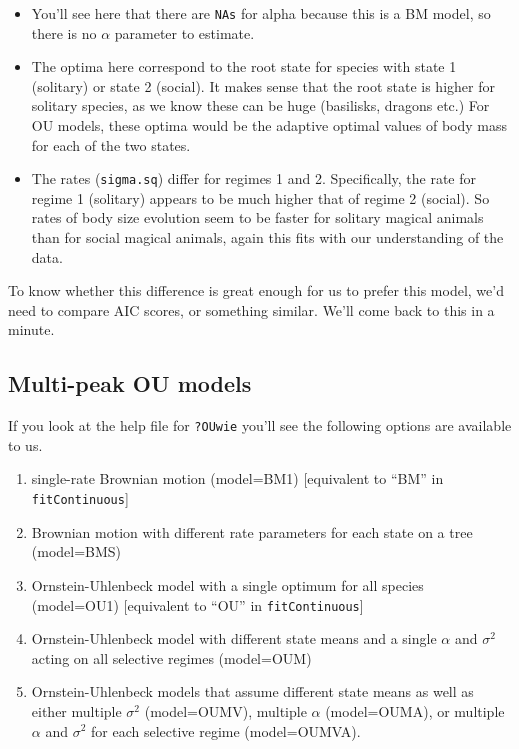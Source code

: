 \documentclass[]{book}
\providecommand{\tightlist}{%
  \setlength{\itemsep}{0pt}\setlength{\parskip}{0pt}}
\begin{document}
\begin{itemize}
\tightlist
\item
  You'll see here that there are \texttt{NAs} for alpha because this is
  a BM model, so there is no \(\alpha\) parameter to estimate.
\item
  The optima here correspond to the root state for species with state 1
  (solitary) or state 2 (social). It makes sense that the root state is
  higher for solitary species, as we know these can be huge (basilisks,
  dragons etc.) For OU models, these optima would be the adaptive
  optimal values of body mass for each of the two states.
\item
  The rates (\texttt{sigma.sq}) differ for regimes 1 and 2.
  Specifically, the rate for regime 1 (solitary) appears to be much
  higher that of regime 2 (social). So rates of body size evolution seem
  to be faster for solitary magical animals than for social magical
  animals, again this fits with our understanding of the data.
\end{itemize}

To know whether this difference is great enough for us to prefer this
model, we'd need to compare AIC scores, or something similar. We'll come
back to this in a minute.

\subsection{Multi-peak OU models}\label{multi-peak-ou-models}

If you look at the help file for \texttt{?OUwie} you'll see the
following options are available to us.

\begin{enumerate}
\def\labelenumi{\arabic{enumi}.}
\tightlist
\item
  single-rate Brownian motion (model=BM1) {[}equivalent to ``BM'' in
  \texttt{fitContinuous}{]}
\item
  Brownian motion with different rate parameters for each state on a
  tree (model=BMS)
\item
  Ornstein-Uhlenbeck model with a single optimum for all species
  (model=OU1) {[}equivalent to ``OU'' in \texttt{fitContinuous}{]}
\item
  Ornstein-Uhlenbeck model with different state means and a single
  \(\alpha\) and \(\sigma^2\) acting on all selective regimes
  (model=OUM)
\item
  Ornstein-Uhlenbeck models that assume different state means as well as
  either multiple \(\sigma^2\) (model=OUMV), multiple \(\alpha\)
  (model=OUMA), or multiple \(\alpha\) and \(\sigma^2\) for each
  selective regime (model=OUMVA).
\end{enumerate}
\end{document}
